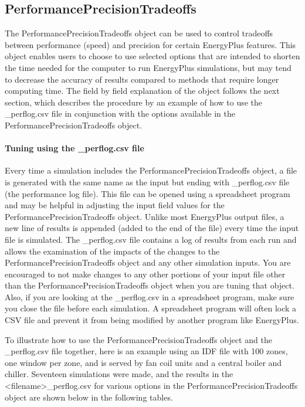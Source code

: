 \subsection{PerformancePrecisionTradeoffs}\label{performanceprecisiontradeoffs}

The PerformancePrecisionTradeoffs object can be used to control tradeoffs between performance (speed) and precision for certain EnergyPlus features. This object enables users to choose to use selected options that are intended to shorten the time needed for the computer to run EnergyPlus simulations, but may tend to decrease the accuracy of results compared to methods that require longer computing time. The field by field explanation of the object follows the next section, which describes the procedure by an example of how to use the \_perflog.csv file in conjunction with the options available in the PerformancePrecisionTradeoffs object.

\paragraph{Tuning using the \_perflog.csv file}\label{tuning-using-perlog-csv-file}

Every time a simulation includes the PerformancePrecisionTradeoffs object, a file is generated with the same name as the input but ending with \_perflog.csv file (the performance log file). This file can be opened using a spreadsheet program and may be helpful in adjusting the input field values for the PerformancePrecisionTradeoffs object. Unlike most EnergyPlus output files, a new line of results is appended (added to the end of the file) every time the input file is simulated. The \_perflog.csv file contains a log of results from each run and allows the examination of the impacts of the changes to the PerformancePrecisionTradeoffs object and any other simulation inputs. You are encouraged to not make changes to any other portions of your input file other than the PerformancePrecisionTradeoffs object when you are tuning that object. Also, if you are looking at the \_perflog.csv in a spreadsheet program, make sure you close the file before each simulation. A spreadsheet program will often lock a CSV file and prevent it from being modified by another program like EnergyPlus.

To illustrate how to use the PerformancePrecisionTradeoffs object and the \_perflog.csv file together, here is an example using an IDF file with 100 zones, one window per zone, and is served by fan coil units and a central boiler and chiller. Seventeen simulations were made, and the results in the <filename>\_perflog.csv for various options in the PerformancePrecisionTradeoffs object are shown below in the following tables.


